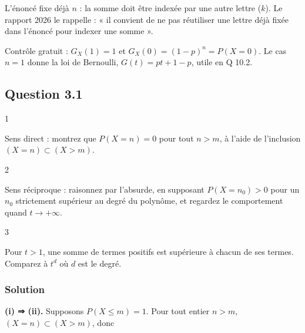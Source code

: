 \documentclass[11pt,a4paper]{article}
\newcommand{\equationajustee}[1]{%
  \sbox{\boiteequation}{$\displaystyle #1$}%
  \ifdim\wd\boiteequation>\linewidth
    \[\resizebox{\linewidth}{!}{\usebox{\boiteequation}}\]%
  \else
    \[#1\]%
  \fi}
\begin{document}
\equationajustee{\boxed{G_X(t)=(pt+1-p)^n}}

\begin{piege}

L'énoncé fixe déjà \(n\) : la somme doit être indexée par une autre lettre (\(k\)). Le rapport 2026 le rappelle : « il convient de ne pas réutiliser une lettre déjà fixée dans l'énoncé pour indexer une somme ».

\end{piege}

\begin{methode}

Contrôle gratuit : \(G_X(1)=1\) et \(G_X(0)=(1-p)^n=P(X=0)\). Le cas \(n=1\) donne la loi de Bernoulli, \(G(t)=pt+1-p\), utile en Q 10.2.

\end{methode}

\hypertarget{question-3.1}{%
\subsection{Question 3.1}\label{question-3.1}}

\begin{indication}{1}

Sens direct : montrez que \(P(X=n)=0\) pour tout \(n>m\), à l'aide de l'inclusion \((X=n)\subset(X>m)\).

\end{indication}

\begin{indication}{2}

Sens réciproque : raisonnez par l'absurde, en supposant \(P(X=n_0)>0\) pour un \(n_0\) strictement supérieur au degré du polynôme, et regardez le comportement quand \(t\to+\infty\).

\end{indication}

\begin{indication}{3}

Pour \(t>1\), une somme de termes positifs est supérieure à chacun de ses termes. Comparez à \(t^d\) où \(d\) est le degré.

\end{indication}

\hypertarget{solution-7}{%
\subsubsection{Solution}\label{solution-7}}

\textbf{(i) ⇒ (ii).} Supposons \(P(X\le m)=1\). Pour tout entier \(n>m\), \((X=n)\subset(X>m)\), donc
\end{document}
